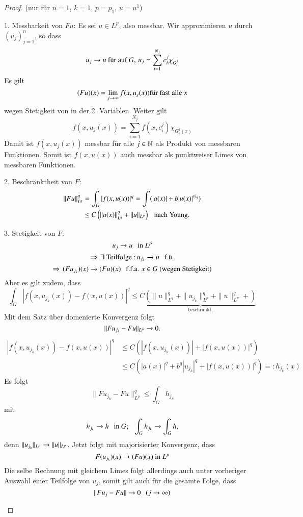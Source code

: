 \begin{proof}
    (nur für $n=1$, $k=1$, $p=p_1$, $u=u^1$)
    \begin{description}
    \item{1. Messbarkeit von $Fu$:}
    Es sei $u\in L^p$, also messbar. Wir approximieren $u$ durch
    $(u_j)_{j=1}^n$, so dass
    \[
        u_j\rightarrow u \text{ für auf } G, \, u_j=\sum_{i=1}^{N_j} c_i^j \chi_{G_i^j}
    \]
    Es gilt
    \[
        (Fu)(x)= \lim_{j\rightarrow \infty} f(x,u_j(x)) \text{für fast alle } x
    \]
    wegen Stetigkeit von in der 2. Variablen. Weiter gilt
    \[
        f(x,u_j(x))=\sum_{i=1}^{N_j} f(x,c_i^j) \chi_{G_i^j(x)}
    \]
    Damit ist $f(x,u_j(x))$ messbar für alle $j\in \mathbb{N}$ als Produkt von messbaren Funktionen.
    Somit ist $f(x,u(x))$ auch messbar als punktweiser Limes von messbaren Funktionen.

    \item{2. Beschränktheit von $F$:}
    \begin{align*}
        \|Fu\|_{L^q}^q &= \int_G|f(x,u(x))|^q= \int(|a(x)| + b |u(x)|^{\nicefrac pq})\\
            &\leq C\left( \|a(x)\|_{L^q}^q+\|u\|_{L^p} \right) \hspace{.25cm} \text{nach Young}.
    \end{align*}
    \item{3. Stetigkeit von $F$:}
    \[u_j\rightarrow u \hspace{.25cm} \text{in } L^p\]
    \[
        \Rightarrow \, \exists \text{ Teilfolge :} \, u_{j_k}\rightarrow u \hspace{.25cm} \text{f.ü.}
    \]
    \[
        \Rightarrow \, (Fu_{j_k})(x) \rightarrow (Fu)(x) \hspace{.25cm} \text{f.f.a. } x\in G \text{ (wegen Stetigkeit)}
    \]
    Aber es gilt zudem, dass
    \[
        \int_G|f(x,u_{j_k}(x)) - f(x,u(x))|^q \leq C \underbrace{(\|u\|^q_{L^q} + \|u_{j_k}\|_{L^p}^q+\|u\|_{L^p}^q+)}
        _{\text{beschränkt.}}
    \]
    Mit dem Satz über domenierte Konvergenz folgt
    \[
        \|Fu_{j_k}-Fu\|_{L^p}\rightarrow 0.
    \]
    \begin{align*}
        |f(x,u_{j_k}(x)) - f(x,u(x))|^q &\leq C(|f(x,u_{j_k}(x))|+ |f(x,u(x))|^q)\\
        &\leq C(|a(x)|^q + b^q|u_{j_k}|^q + |f(x,u(x))|^q) =: h_{j_k}(x)
    \end{align*}
    Es folgt
    \[
        \|Fu_{j_k}-Fu\|_{L^q}^q\leq \int_G h_{j_k}
    \]
    mit
    \[
        h_{j_k}\rightarrow h \hspace{.25cm} \text{in } G; \hspace{.25cm} \int_{G}h_{j_k} \rightarrow \int_G h,
    \]
    denn $\|u_{j_k}\|_{L^p}\rightarrow \|u\|_{L^p}$. Jetzt folgt mit majorisierter Konvergenz, dass
    \[
        F(u_{j_k})(x)\rightarrow (Fu)(x) \text{ in } L^p
    \]
    Die selbe Rechnung mit gleichem Limes folgt allerdings auch unter vorheriger
    Auswahl einer Teilfolge von $u_j$, somit gilt auch für die gesamte Folge, dass
    \[
        \|Fu_j-Fu\|\rightarrow 0 \hspace{.25cm} (j\rightarrow \infty)
    \]
    \end{description}\[ \]
\end{proof}


